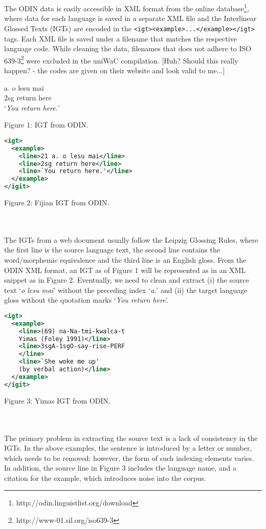 \documentclass[11pt]{article}
\begin{document}
The ODIN data is easily accessible in XML format from the online database\footnote{http://odin.linguistlist.org/download}, where data for each language is saved in a separate XML file and the Interlinear Glossed Texts (IGTs) are encoded in the \texttt{<igt><example>...</example></igt>} tags. Each XML file is saved under a filename that matches the respective language code. While cleaning the data, filenames that does not adhere to ISO 639-3\footnote{http://www-01.sil.org/iso639-3} were excluded in the uniWaC compilation. [Huh? Should this really happen? - the codes are given on their website and look valid to me...]

\begin{minipage}{\columnwidth}

a. \quad o lesu mai \\
\indent \qquad 2sg return here \\

\indent \qquad `\emph{You return here.}' \\
\centerline{Figure 1: IGT from ODIN.}
\end{minipage}

\begin{minipage}{\columnwidth}
\begin{lstlisting}[language=XML]
<igt>
  <example>
    <line>21 a. o lesu mai</line>
    <line>2sg return here</line>
    <line>`You return here.'</line>
  </example>
</igit>
\end{lstlisting} 
\centerline{Figure 2: Fijian IGT from ODIN.}
\end{minipage}
\\ \\
\noindent The IGTs from a web document usually follow the Leipzig Glossing Rules, where the first line is the source language text, the second line contains the word/morphemic equivalence and the third line is an English gloss. From the ODIN XML format, an IGT as of Figure 1 will be represented as in an XML snippet as in Figure 2. Eventually, we need to clean and extract (i) the source text `\emph{o lesu mai}' without the preceding index `\emph{a.}' and (ii) the target language gloss without the quotation marks `\emph{You return here}'.
\begin{minipage}{\columnwidth}
\begin{lstlisting}[language=XML]
<igt>
  <example>
    <line>(69) na-Na-tmi-kwalca-t 
    Yimas (Foley 1991)</line>
    <line>3sgA-1sgO-say-rise-PERF
    </line>
    <line>`She woke me up' 
    (by verbal action)</line>
  </example>
</igit>
\end{lstlisting} 
\smallskip
\centerline{Figure 3: Yimas IGT from ODIN.}
\end{minipage}
\\ \\
\noindent The primary problem in extracting the source text is a lack of consistency in the IGTs. In the above examples, the sentence is introduced by a letter or number, which needs to be removed; however, the form of such indexing elements varies. In addition, the source line in Figure 3 includes the language name, and a citation for the example, which introduces noise into the corpus.
\end{document}
